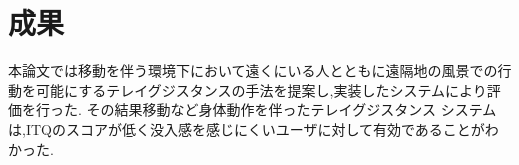 \section{成果}
本論文では移動を伴う環境下において遠くにいる人とともに遠隔地の風景での行動を可能にするテレイグジスタンスの手法を提案し,実装したシステムにより評価を行った.
その結果移動など身体動作を伴ったテレイグジスタンス システムは,ITQのスコアが低く没入感を感じにくいユーザに対して有効であることがわかった.